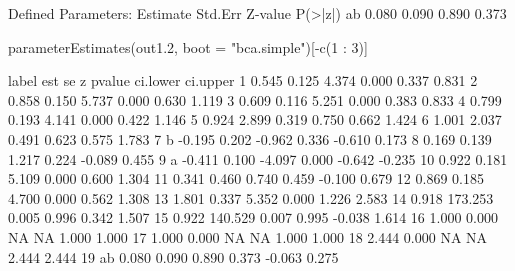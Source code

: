 \begin{Schunk}
\begin{Soutput}
Defined Parameters:
                   Estimate  Std.Err  Z-value  P(>|z|)
    ab                0.080    0.090    0.890    0.373
\end{Soutput}
\begin{Sinput}
 parameterEstimates(out1.2, boot = "bca.simple")[-c(1 : 3)]
\end{Sinput}
\begin{Soutput}
   label    est      se      z pvalue ci.lower ci.upper
1         0.545   0.125  4.374  0.000    0.337    0.831
2         0.858   0.150  5.737  0.000    0.630    1.119
3         0.609   0.116  5.251  0.000    0.383    0.833
4         0.799   0.193  4.141  0.000    0.422    1.146
5         0.924   2.899  0.319  0.750    0.662    1.424
6         1.001   2.037  0.491  0.623    0.575    1.783
7      b -0.195   0.202 -0.962  0.336   -0.610    0.173
8         0.169   0.139  1.217  0.224   -0.089    0.455
9      a -0.411   0.100 -4.097  0.000   -0.642   -0.235
10        0.922   0.181  5.109  0.000    0.600    1.304
11        0.341   0.460  0.740  0.459   -0.100    0.679
12        0.869   0.185  4.700  0.000    0.562    1.308
13        1.801   0.337  5.352  0.000    1.226    2.583
14        0.918 173.253  0.005  0.996    0.342    1.507
15        0.922 140.529  0.007  0.995   -0.038    1.614
16        1.000   0.000     NA     NA    1.000    1.000
17        1.000   0.000     NA     NA    1.000    1.000
18        2.444   0.000     NA     NA    2.444    2.444
19    ab  0.080   0.090  0.890  0.373   -0.063    0.275
\end{Soutput}
\end{Schunk}
